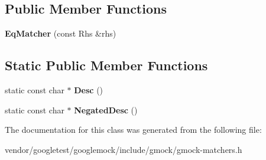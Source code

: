 \subsection*{Public Member Functions}
\begin{DoxyCompactItemize}
\item 
{\bfseries Eq\+Matcher} (const Rhs \&rhs)\hypertarget{classtesting_1_1internal_1_1EqMatcher_a9051e33bc31f413a3c958d04cc090b46}{}\label{classtesting_1_1internal_1_1EqMatcher_a9051e33bc31f413a3c958d04cc090b46}

\end{DoxyCompactItemize}
\subsection*{Static Public Member Functions}
\begin{DoxyCompactItemize}
\item 
static const char $\ast$ {\bfseries Desc} ()\hypertarget{classtesting_1_1internal_1_1EqMatcher_a3ddc72ceade061ad56debfa0a4dc2749}{}\label{classtesting_1_1internal_1_1EqMatcher_a3ddc72ceade061ad56debfa0a4dc2749}

\item 
static const char $\ast$ {\bfseries Negated\+Desc} ()\hypertarget{classtesting_1_1internal_1_1EqMatcher_ae99a542c124694d5b91793a2df9202dc}{}\label{classtesting_1_1internal_1_1EqMatcher_ae99a542c124694d5b91793a2df9202dc}

\end{DoxyCompactItemize}


The documentation for this class was generated from the following file\+:\begin{DoxyCompactItemize}
\item 
vendor/googletest/googlemock/include/gmock/gmock-\/matchers.\+h\end{DoxyCompactItemize}

